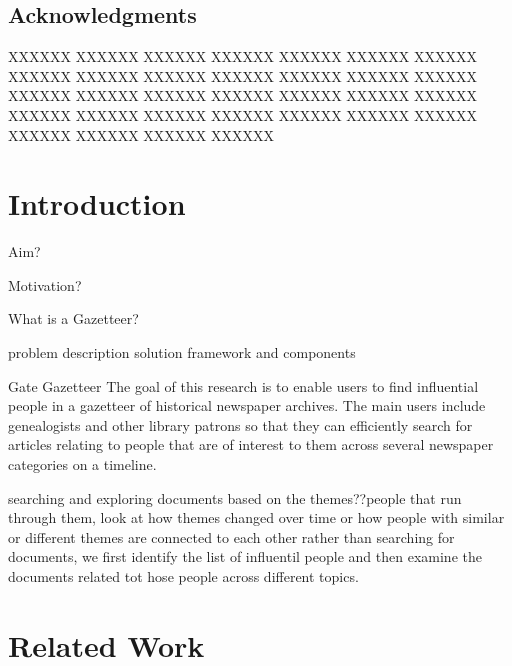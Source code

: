 \documentclass[letterpaper,11pt]{report}
\begin{document}
\newpage
\pagestyle{empty}


\newpage



\section*{Acknowledgments}\label{section:acknowledgments}
\pagestyle{plain}

XXXXXX XXXXXX XXXXXX XXXXXX XXXXXX XXXXXX XXXXXX XXXXXX XXXXXX XXXXXX XXXXXX XXXXXX XXXXXX XXXXXX XXXXXX XXXXXX XXXXXX XXXXXX XXXXXX XXXXXX XXXXXX XXXXXX XXXXXX XXXXXX XXXXXX XXXXXX XXXXXX XXXXXX XXXXXX XXXXXX XXXXXX XXXXXX 

\newpage

\tableofcontents
\listoffigures 
\listoftables

\newpage

\newpage

\newpage
\mbox{}



\chapter{Introduction}\label{chapter:introduction}
\setcounter{page}{1}
\onehalfspacing

Aim?

Motivation? 

What is a Gazetteer?

problem description
solution framework and components

Gate Gazetteer
The goal of this research is to enable users to find influential people in a gazetteer of historical newspaper archives. The main users  include genealogists and other library patrons so that  they can efficiently search for articles relating to people that are of interest to them across several newspaper categories on a timeline.

 searching and exploring documents 
based on the themes??people that run through them, look at how themes changed over time 
or how people with similar or different themes are connected to each other
rather than searching for documents, we first identify the list of influentil people and then examine the documents related tot hose people across different topics.

\chapter{Related Work}
\end{document}

